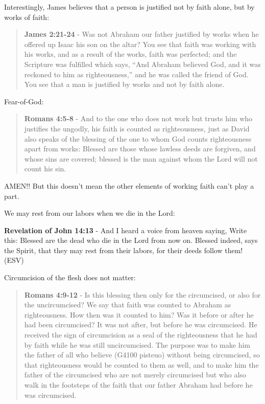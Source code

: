 \documentclass[11pt]{article}
\begin{document}
Interestingly, James believes that a person is justified not by faith alone, but by works of faith:

\begin{quote}
\textbf{James 2:21-24} - Was not Abraham our father justified by works when he offered up Isaac his son on the altar? You see that faith was working with his works, and as a result of the works, faith was perfected; and the Scripture was fulfilled which says, “And Abraham believed God, and it was reckoned to him as righteousness,” and he was called the friend of God. You see that a man is justified by works and not by faith alone.
\end{quote}

Fear-of-God:

\begin{quote}
\textbf{Romans 4:5-8} - And to the one who does not work but trusts him who justifies the ungodly, his faith is counted as righteousness, just as David also speaks of the blessing of the one to whom God counts righteousness apart from works: Blessed are those whose lawless deeds are forgiven, and whose sins are covered; blessed is the man against whom the Lord will not count his sin.
\end{quote}

AMEN!! But this doesn't mean the other elements of working faith can't play a part.

We may rest from our labors when we die in the Lord:

\textbf{Revelation of John 14:13} - And I heard a voice from heaven saying, Write this: Blessed are the dead who die in the Lord from now on. Blessed indeed, says the Spirit, that they may rest from their labors, for their deeds follow them! (ESV)

Circumcision of the flesh does not matter:

\begin{quote}
\textbf{Romans 4:9-12} - Is this blessing then only for the circumcised, or also for the uncircumcised? We say that faith was counted to Abraham as righteousness. How then was it counted to him? Was it before or after he had been circumcised? It was not after, but before he was circumcised. He received the sign of circumcision as a seal of the righteousness that he had by faith while he was still uncircumcised. The purpose was to make him the father of all who believe (G4100 pisteuo) without being circumcised, so that righteousness would be counted to them as well, and to make him the father of the circumcised who are not merely circumcised but who also walk in the footsteps of the faith that our father Abraham had before he was circumcised.
\end{quote}
\end{document}
